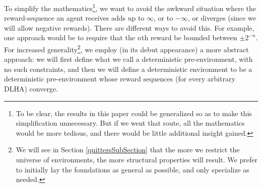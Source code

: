 \documentclass[twoside,11pt]{article}
\begin{document}
To simplify the mathematics\footnote{To be clear, the results in this paper
could be generalized so as to make this simplification unnecessary.
But if we went that route, all the
mathematics would be more tedious, and there would be little additional
insight gained.}, we want to avoid the awkward situation where
the reward-sequence an agent receives adds up to $\infty$, or to $-\infty$,
or diverges (since we will allow negative rewards). There are different ways
to avoid this. For example, one
approach would be to require that the $n$th reward be bounded
between $\pm 2^{-n}$. For increased
generality\footnote{We will see in Section \ref{quittersSubSection} that the
more we restrict
the universe of environments, the more structural properties will result. We prefer
to initially lay the foundations as general as possible, and only specialize as
needed.},
we employ (in its debut appearance) a more
abstract approach: we will first define what we call a deterministic pre-environment,
with no such constraints, and then we will define a deterministic environment to be
a deterministic pre-environment whose reward sequences (for every arbitrary DLHA) converge.
\end{document}
